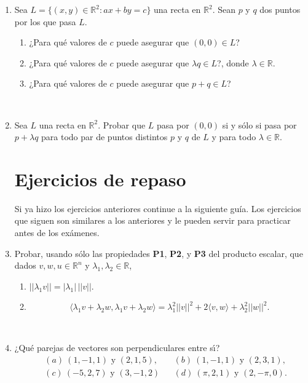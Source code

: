 \documentclass[11pt,spanish,makeidx,reqno]{amsbook}
\begin{document}
\begin{enumerate}
\

\item Sea $L=\{(x,y)\in\mathbb{R}^2 : ax+by=c\}$ una recta en $\mathbb{R}^2$. Sean $p$ y $q$ dos puntos por los que pasa $L$.
\begin{enumerate}
 \item ¿Para qu\'e valores de $c$ puede asegurar que $(0,0)\in L$?
 \item ¿Para qu\'e valores de $c$ puede asegurar que $\lambda q\in L$?, donde $\lambda\in\mathbb{R}$.
 \item ¿Para qu\'e valores de $c$ puede asegurar que $p+q\in L$?
\end{enumerate}


\

\item Sea $L$ una recta en $\mathbb{R}^2$. Probar que $L$ pasa por $(0,0)$ si y s\'olo si pasa por $p+\lambda q$ para todo par de puntos distintos $p$ y $q$ de $L$ y para todo $\lambda\in\mathbb{R}$.


\section*{Ejercicios de repaso}

 Si ya hizo los ejercicios anteriores continue a la siguiente gu\'ia. Los ejercicios que siguen son similares a los anteriores y le pueden servir para practicar antes de los ex\'amenes.
\item Probar, usando sólo las propiedades \textbf{P1}, \textbf{P2}, y \textbf{P3} del producto escalar, que dados $v, w, u \in \mathbb R^n$ y $\lambda_1, \lambda_2 \in \mathbb R$, 
\begin{enumerate}	
	\item $||\lambda_1 v|| = |\lambda_1|\, ||v||$.
	\item  
	\begin{equation*}
	\langle \lambda_1 v + \lambda_2 w ,  \lambda_1 v + \lambda_2 w   \rangle =
	\lambda_1^2 || v||^2 + 2  \langle v,w  \rangle + \lambda_2^2 ||w||^2 .
	\end{equation*}
\end{enumerate}

\

\item ¿Qu\'e parejas de vectores son perpendiculares entre s{\'\i}?
\begin{align*}
&(a) \ (1, -1,1) \text{ y } (2,1,5), && (b)  \ (1,-1,1) \text{ y } (2,3,1), \\
&(c) \  (-5,2,7)  \text{ y } (3,-1,2) && (d)  \ (\pi,2,1) \text{ y }  (2, -\pi,0).
\end{align*}


\end{enumerate}
\end{document}
